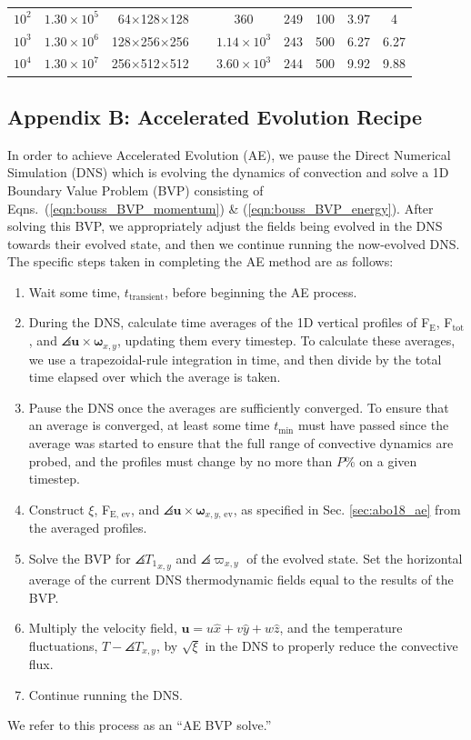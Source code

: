 \begin{table}
\begin{center}
\begin{tabular}{ c c r | c c c  | c c  }
$10^2$          &	$1.30 \times 10^5$	&	64$\times$128$\times$128$\,\,\,\,\,\,\,$   &	$360$	&	$249$	&	100	&	3.97	&	4	\\
$10^3$          &	$1.30 \times 10^6$	&	128$\times$256$\times$256$\,\,\,\,\,\,\,$	&	$1.14 \times 10^3$	&	$243$	&	500	&	6.27	&	6.27	\\
$10^4$          &	$1.30 \times 10^7$	&	256$\times$512$\times$512$\,\,\,\,\,\,\,$	&	$3.60 \times 10^3$	&	$244$	&	500	&	9.92	&	9.88	\\
\hline																	
\end{tabular}
\end{center}
\end{table}


\subsection{Appendix B: Accelerated Evolution Recipe}
\label{appendix:recipe}
In order to achieve Accelerated Evolution (AE), we pause the Direct Numerical Simulation (DNS) which is evolving the dynamics of convection and solve a 1D Boundary Value Problem (BVP) consisting of Eqns.~(\ref{eqn:bouss_BVP_momentum}) \& (\ref{eqn:bouss_BVP_energy}).
After solving this BVP, we appropriately adjust the fields being evolved in the DNS towards their evolved state, and then we continue running the now-evolved DNS.
The specific steps taken in completing the AE method are as follows:
\begin{enumerate}
	\item Wait some time, $t_{\text{transient}}$, before beginning the AE process.
	\item During the DNS, calculate time averages of the 1D vertical profiles of
	F$_{\text{E}}$, F$_{\text{tot}}$, and $\angles{\bm{u} \times \bm{\omega}}_{x,y}$, updating them every timestep.  
	To calculate these averages, we use a trapezoidal-rule integration in time, and then divide by the total time elapsed over which the average is taken. 
	\item Pause the DNS once the averages are sufficiently converged. 
	To ensure that an average is converged, at least some time $t_{\text{min}}$ must have passed since the average was started to ensure that the full range of convective dynamics are probed, and the profiles must change by no more than $P$\% on a given timestep.
	\item Construct $\xi$, F$_{\text{E, ev}}$, and $\angles{\bm{u} \times \bm{\omega}}_{x,y\text{, ev}}$, as specified in Sec. \ref{sec:abo18_ae} from the averaged profiles.
	\item Solve the BVP for $\angles{T_1}_{x,y}$ and $\angles{\varpi}_{x,y}$ of the evolved state.  
	Set the horizontal average of the current DNS thermodynamic fields equal to the results of the BVP.
	\item Multiply the velocity field, $\bm{u} = u\hat{x} + v\hat{y} + w\hat{z}$, and the temperature fluctuations, $T - \angles{T}_{x,y}$, by $\sqrt{\xi}$ in the DNS to properly reduce the convective flux.
	\item Continue running the DNS.
\end{enumerate}
We refer to this process as an ``AE BVP solve.''

